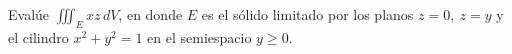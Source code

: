 \item Evalúe $\iiint_E xz \, dV$, en donde $E$ es el sólido limitado por los planos $z = 0, \ z = y$ y el cilindro $x^2 + y^2 = 1$ en el semiespacio $y \ge 0$.
